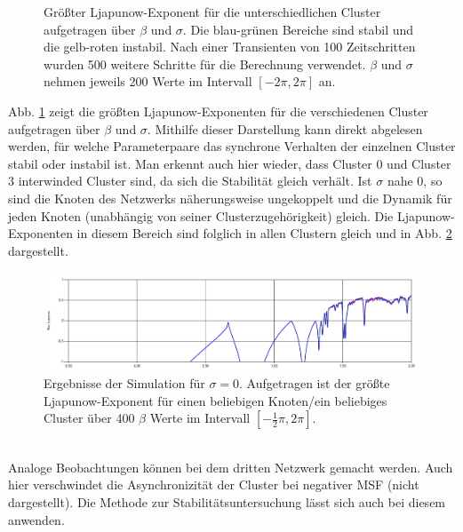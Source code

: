 \begin{figure}[h]
{	}
	\caption{Größter Ljapunow-Exponent für die unterschiedlichen Cluster aufgetragen über $\beta$ und $\sigma$. Die blau-grünen Bereiche sind stabil und die gelb-roten instabil. Nach einer Transienten von 100 Zeitschritten wurden 500 weitere Schritte für die Berechnung verwendet. $\beta$ und $\sigma$ nehmen jeweils 200 Werte im Intervall $[-2\pi,2\pi]$ an.}
	\label{fig:2dplots}	
\end{figure}
Abb. \ref{fig:2dplots} zeigt die größten Ljapunow-Exponenten für die verschiedenen Cluster aufgetragen über $\beta$ und $\sigma$. Mithilfe dieser Darstellung kann direkt abgelesen werden, für welche Parameterpaare das synchrone Verhalten der einzelnen Cluster stabil oder instabil ist. Man erkennt auch hier wieder, dass Cluster 0 und Cluster 3 interwinded Cluster sind, da sich die Stabilität gleich verhält. Ist $\sigma$ nahe 0, so sind die Knoten des Netzwerks näherungsweise ungekoppelt und die Dynamik für jeden Knoten (unabhängig von seiner Clusterzugehörigkeit) gleich. Die Ljapunow-Exponenten in diesem Bereich sind folglich in allen Clustern gleich und in Abb. \ref{fig:sigma0} dargestellt. 
\begin{figure}
	\centering
	\includegraphics[width=1.0\textwidth]{abb/misc/sigma0.png}
	\caption{Ergebnisse der Simulation für $\sigma=0$. Aufgetragen ist der größte Ljapunow-Exponent für einen beliebigen Knoten/ein beliebiges Cluster über 400 $\beta$ Werte im Intervall $[-\frac{1}{2}\pi,2\pi]$.}
	\label{fig:sigma0}
\end{figure}\\
Analoge Beobachtungen können bei dem dritten Netzwerk gemacht werden. Auch hier verschwindet die Asynchronizität der Cluster bei negativer MSF (nicht dargestellt). Die Methode zur Stabilitätsuntersuchung lässt sich auch bei diesem anwenden.